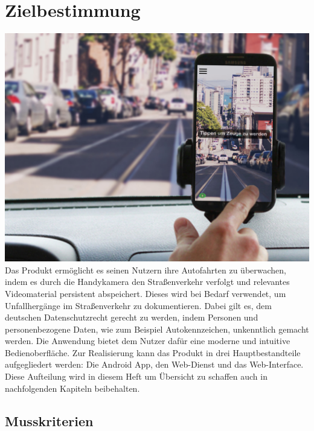 \chapter{Zielbestimmung}

\includegraphics[width=\textwidth]{subtopicsFuncspec/Res//Mockups/Portrait_camera_view_car.jpg}\\[0.5cm]

Das Produkt ermöglicht es seinen Nutzern ihre Autofahrten zu überwachen, indem es durch die Handykamera den Straßenverkehr verfolgt und relevantes Videomaterial persistent abspeichert. Dieses wird bei Bedarf verwendet, um Unfallhergänge im Straßenverkehr zu dokumentieren. Dabei gilt es, dem deutschen Datenschutzrecht gerecht zu werden, indem Personen und personenbezogene Daten, wie zum Beispiel Autokennzeichen, unkenntlich gemacht werden. Die Anwendung bietet dem Nutzer dafür eine moderne und intuitive Bedienoberfläche.\newline
Zur Realisierung kann das Produkt in drei Hauptbestandteile aufgegliedert werden: Die Android App, den Web-Dienst und das Web-Interface. Diese Aufteilung wird in diesem Heft um Übersicht zu schaffen auch in nachfolgenden Kapiteln beibehalten.

\section{Musskriterien}
